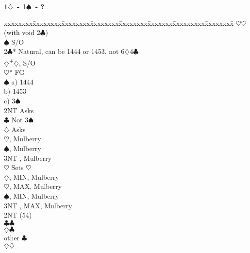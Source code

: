 \documentclass[10pt]{article}
\renewcommand{\c}{$\clubsuit$}
\renewcommand{\d}{$\diamondsuit$}
\newcommand{\h}{$\heartsuit$}
\newcommand{\s}{$\spadesuit$}
\newcommand{\p}{\textsuperscript{+}}
\newenvironment{bidtable}[1][]
{\textbf{#1}
  \begin{adjustwidth}{1em}{}
    \addvspace{2pt}
    \begin{tabbing}
      xxxxxxxx\=xxxxxxxx\=xxxxxxxx\=xxxxxxxx\=xxxxxxxx\=xxxxxxx\=xxxxxxxxx\=xxxxxxxx\=\kill}
{\end{tabbing}\end{adjustwidth}\bigskip}%
\begin{document}
\begin{bidtable}[1\d\ - 1\s\ - ?]
     \h  {}\h (with void 2\c)                                  \\
     \s  \> S/O                                                  \\
2\c* \> Natural, can be 1444 or 1453, not 6\d 4\c                    \\
     \d  {}\p\d, S/O                                           \\
     \h* \> FG                                                   \\
     \>      \s \> a) 1444                                       \\
     \>      \>     \> b) 1453                                       \\
     \>      \>     \> c) 3\s                                        \\
     \>      \>     \> 2NT  \> Asks                                  \\
     \>      \>     \>      \c   \> Not 3\s                      \\
     \>      \>     \>      \>       \d \> Asks                  \\
     \>      \>     \>      \>       \>     \h {}, Mulberry \\
     \>      \>     \>      \>       \>     \s {}, Mulberry \\
     \>      \>     \>      \>       \>     \> 3NT , Mulberry \\
     \>      \>     \>      \>       \h \> Sets \h               \\
     \>      \>     \>      \d   {}, MIN, Mulberry          \\
     \>      \>     \>      \h   {}, MAX, Mulberry          \\
     \>      \>     \>      \s   {}, MIN, Mulberry          \\
     \>      \>     \>      \> 3NT   , MAX, Mulberry          \\
     \>      \> 2NT (54)                                        \\
     \>      \>     \c  {}\c                                   \\
     \>      \>     \>      \d   {}\c                          \\
     \>      \>     \>      \> other \c                          \\
     \>      \>     \d  {}\d                                   \\

\end{bidtable}
\end{document}
